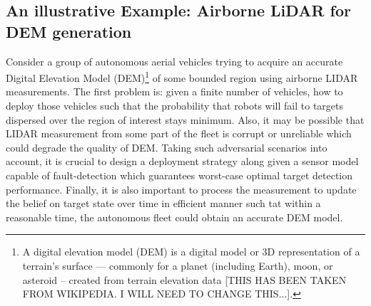 \documentclass[letterpaper, 10 pt, conference]{ieeeconf}
\newcommand{\Ram}[1]{{\normalsize{\textbf{({\color{green}Ram:\ }#1)}}}}
\newcommand{\rood}[1]{{\color{red}{[#1]}}}
\begin{document}



\subsection{An illustrative Example: Airborne LiDAR for DEM generation}
\label{sec:sec22}
Consider a group of autonomous aerial vehicles trying to acquire an accurate Digital Elevation Model (DEM)\footnote{A digital elevation model (DEM) is a digital model or 3D representation of a terrain's surface — commonly for a planet (including Earth), moon, or asteroid -- created from terrain elevation data [THIS HAS BEEN TAKEN FROM WIKIPEDIA. I WILL NEED TO CHANGE THIS...].} of some bounded region using airborne LIDAR measurements.
The first problem is: given a finite number of vehicles, how to deploy those vehicles such that the probability that robots will fail to targets dispersed over the region of interest stays minimum. Also, it may be possible that LIDAR measurement from some part of the fleet is corrupt or unreliable which could degrade the quality of DEM. Taking such adversarial scenarios into account, it is crucial to design a deployment strategy along given a sensor model capable of fault-detection which guarantees worst-case optimal target detection performance. 
Finally, it is also important to process the measurement to update the belief on target state over time in efficient manner such tat within a reasonable time, the autonomous fleet could obtain an accurate DEM model.
\end{document}
